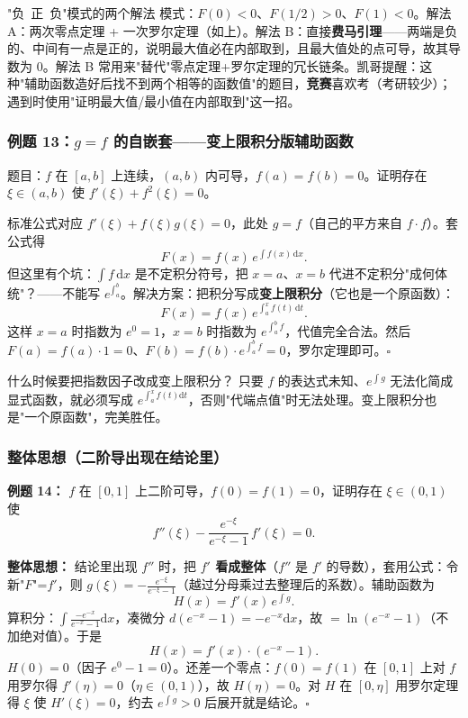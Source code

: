 \documentclass[a4paper]{article}
\begin{document}
\begin{knowledgebox}{"负\ 正\ 负"模式的两个解法}
模式：$F(0)<0$、$F(1/2)>0$、$F(1)<0$。解法 A：两次零点定理 + 一次罗尔定理（如上）。解法 B：直接\textbf{费马引理}——两端是负的、中间有一点是正的，说明最大值必在内部取到，且最大值处的点可导，故其导数为 0。解法 B 常用来"替代"零点定理+罗尔定理的冗长链条。凯哥提醒：这种"辅助函数造好后找不到两个相等的函数值"的题目，\textbf{竞赛}喜欢考（考研较少）；遇到时使用"证明最大值/最小值在内部取到"这一招。
\end{knowledgebox}

\subsubsection{例题 13：$g=f$ 的自嵌套——变上限积分版辅助函数}

题目：$f$ 在 $[a,b]$ 上连续，$(a,b)$ 内可导，$f(a)=f(b)=0$。证明存在 $\xi\in(a,b)$ 使 $f'(\xi)+f^2(\xi)=0$。

标准公式对应 $f'(\xi)+f(\xi)g(\xi)=0$，此处 $g=f$（自己的平方来自 $f\cdot f$）。套公式得
\[
F(x)=f(x)\,e^{\int f(x)\,\mathrm{d}x}.
\]
但这里有个坑：$\int f\,\mathrm{d}x$ 是不定积分符号，把 $x=a$、$x=b$ 代进不定积分"成何体统"？——不能写 $e^{\int_a^b}$。解决方案：把积分写成\textbf{变上限积分}（它也是一个原函数）：
\[
F(x)=f(x)\,e^{\int_a^x f(t)\,\mathrm{d}t}.
\]
这样 $x=a$ 时指数为 $e^0=1$，$x=b$ 时指数为 $e^{\int_a^b f}$，代值完全合法。然后 $F(a)=f(a)\cdot 1=0$、$F(b)=f(b)\cdot e^{\int_a^b f}=0$，罗尔定理即可。$\square$

\begin{warningbox}{什么时候要把指数因子改成变上限积分？}
只要 $f$ 的表达式未知、$e^{\int g}$ 无法化简成显式函数，就必须写成 $e^{\int_a^x f(t)\mathrm{d}t}$，否则"代端点值"时无法处理。变上限积分也是"一个原函数"，完美胜任。
\end{warningbox}

\subsubsection{整体思想（二阶导出现在结论里）}

\textbf{例题 14：} $f$ 在 $[0,1]$ 上二阶可导，$f(0)=f(1)=0$，证明存在 $\xi\in(0,1)$ 使
\[
f''(\xi)-\frac{e^{-\xi}}{e^{-\xi}-1}\,f'(\xi)=0 .
\]

\textbf{整体思想：} 结论里出现 $f''$ 时，把 \textbf{$f'$ 看成整体}（$f''$ 是 $f'$ 的导数），套用公式：令新"$F$"=$f'$，则 $g(\xi)=-\frac{e^{-\xi}}{e^{-\xi}-1}$（越过分母乘过去整理后的系数）。辅助函数为
\[
H(x)=f'(x)\,e^{\int g}.
\]
算积分：$\int\frac{-e^{-x}}{e^{-x}-1}\mathrm{d}x$，凑微分 $d(e^{-x}-1)=-e^{-x}\mathrm{d}x$，故 $=\ln(e^{-x}-1)$（不加绝对值）。于是
\[
H(x)=f'(x)\cdot(e^{-x}-1).
\]
$H(0)=0$（因子 $e^{0}-1=0$）。还差一个零点：$f(0)=f(1)$ 在 $[0,1]$ 上对 $f$ 用罗尔得 $f'(\eta)=0$（$\eta\in(0,1)$），故 $H(\eta)=0$。对 $H$ 在 $[0,\eta]$ 用罗尔定理得 $\xi$ 使 $H'(\xi)=0$，约去 $e^{\int g}>0$ 后展开就是结论。$\square$
\end{document}
